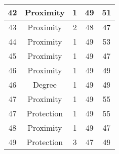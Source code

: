 \documentclass[results.tex]{subfiles}
\begin{document}
\begin{center}
\begin{tabular}{| c || c | c | c | c |}
            \hline
            42                      & Proximity                    & 1                      & 49                      & 51                   \\
            \hline
            43                      & Proximity                    & 2                      & 48                      & 47                   \\
            \hline
            44                      & Proximity                    & 1                      & 49                      & 53                   \\
            \hline
            45                      & Proximity                    & 1                      & 49                      & 47                   \\
            \hline
            46                      & Proximity                    & 1                      & 49                      & 49                   \\
            \hline
            46                      & Degree                       & 1                      & 49                      & 49                   \\
            \hline
            47                      & Proximity                    & 1                      & 49                      & 55                   \\
            \hline
            47                      & Protection                   & 1                      & 49                      & 55                   \\
            \hline
            48                      & Proximity                    & 1                      & 49                      & 47                   \\
            \hline
            49                      & Protection                   & 3                      & 47                      & 49                   \\
            \hline
        \end{tabular}
    \end{center}
\end{document}
